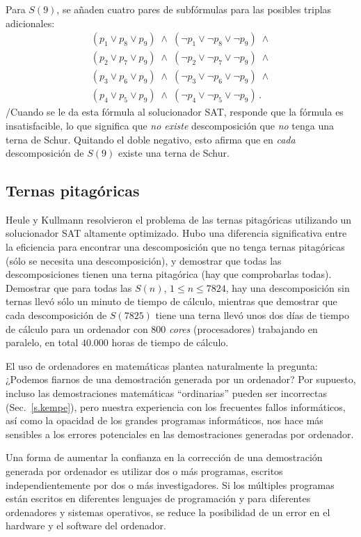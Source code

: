 Para $S(9)$, se añaden cuatro pares de subfórmulas para las posibles triplas adicionales:
\[
\begin{array}{l}
(p_1 \vee p_8 \vee p_9) \;\wedge\; (\neg p_1 \vee \neg p_8 \vee \neg p_9) \;\wedge \\
(p_2 \vee p_7 \vee p_9) \;\wedge\; (\neg p_2 \vee \neg p_7 \vee \neg p_9) \;\wedge \\
(p_3 \vee p_6 \vee p_9) \;\wedge\; (\neg p_3 \vee \neg p_6 \vee \neg p_9) \;\wedge \\
(p_4 \vee p_5 \vee p_9) \;\wedge\; (\neg p_4 \vee \neg p_5 \vee \neg p_9)\,.
\end{array}
\]
/Cuando se le da esta fórmula al solucionador SAT, responde que la fórmula es insatisfacible, lo que significa que \emph{no existe} descomposición que \emph{no} tenga una terna de Schur. Quitando el doble negativo, esto afirma que en \emph{cada} descomposición de $S(9)$ existe una terna de Schur.

\subsection{Ternas pitagóricas}

Heule y Kullmann resolvieron el problema de las ternas pitagóricas utilizando un solucionador SAT altamente optimizado. Hubo una diferencia significativa entre la eficiencia para encontrar una descomposición que no tenga ternas pitagóricas (sólo se necesita una descomposición), y demostrar que todas las descomposiciones tienen una terna pitagórica (hay que comprobarlas todas). Demostrar que para todas las $S(n)$, $1\leq n\leq 7824$, hay una descomposición sin ternas llevó sólo un minuto de tiempo de cálculo, mientras que demostrar que cada descomposición de $S(7825)$ tiene una terna llevó unos dos días de tiempo de cálculo para un ordenador con $800$ \emph{cores} (procesadores) trabajando en paralelo, en total $40.000$ horas de tiempo de cálculo.

El uso de ordenadores en matemáticas plantea naturalmente la pregunta: ¿Podemos fiarnos de una demostración generada por un ordenador? Por supuesto, incluso las demostraciones matemáticas ``ordinarias'' pueden ser incorrectas (Sec.~\ref{s.kempe}), pero nuestra experiencia con los frecuentes fallos informáticos, así como la opacidad de los grandes programas informáticos, nos hace más sensibles a los errores potenciales en las demostraciones generadas por ordenador.

Una forma de aumentar la confianza en la corrección de una demostración generada por ordenador es utilizar dos o más programas, escritos independientemente por dos o más investigadores. Si los múltiples programas están escritos en diferentes lenguajes de programación y para diferentes ordenadores y sistemas operativos, se reduce la posibilidad de un error en el hardware y el software del ordenador.

